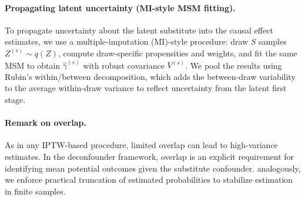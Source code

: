 \paragraph{Propagating latent uncertainty (MI-style MSM fitting).}
To propagate uncertainty about the latent substitute into the causal effect estimates, we use a multiple-imputation (MI)-style procedure: draw $S$ samples $Z^{(s)}\sim q(Z)$, compute draw-specific propensities and weights, and fit the same MSM to obtain $\widehat{\gamma}^{(s)}$ with robust covariance $V^{(s)}$. We pool the results using Rubin's within/between decomposition, which adds the between-draw variability to the average within-draw variance to reflect uncertainty from the latent first stage.

\paragraph{Remark on overlap.}
As in any IPTW-based procedure, limited overlap can lead to high-variance estimates. 
In the deconfounder framework, overlap is an explicit requirement for identifying mean 
potential outcomes given the substitute confounder. 
analogously, we enforce practical truncation of estimated probabilities to 
stabilize estimation in finite samples.

